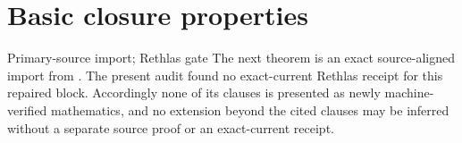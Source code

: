 \section{Basic closure properties}
\label{sec:ch34-closure}

\begin{warning}{Primary-source import; Rethlas gate}
The next theorem is an exact source-aligned import from
\cite[Definition~4.1, Theorems~4.5 and~4.7, Lemmas~4.6 and~4.9,
Corollary~4.17, Theorem~4.22, and Corollary~4.23]{BJ22}.  The present audit
found no exact-current Rethlas receipt for this repaired block.  Accordingly
none of its clauses is presented as newly machine-verified mathematics, and
no extension beyond the cited clauses may be inferred without a separate
source proof or an exact-current receipt.
\end{warning}

